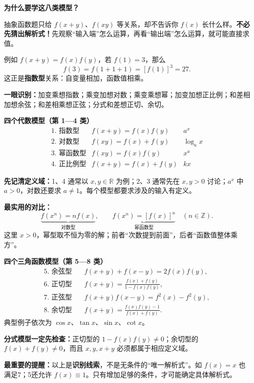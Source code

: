 \FReserve{4cm}
\begin{statementbox}
	\textbf{\textcolor{CStatement}{为什么要学这八类模型？}}

	抽象函数题只给 $f(x+y)$、$f(xy)$ 等关系，却不告诉你 $f(x)$ 长什么样。\textbf{不必先猜出解析式！}先观察“输入端”怎么运算，再看“输出端”怎么运算，就可能直接求值。

	例如 $f(x+y)=f(x)f(y)$，若 $f(1)=3$，那么
	\[
		f(3)=f(1+1+1)=[f(1)]^3=27.
	\]
	这正是\textbf{指数型}关系：自变量相加，函数值相乘。

	

	\textbf{一眼识别：}加变乘想指数；乘变加想对数；乘变乘想幂；加变加想正比例；和差相加想余弦；和差相乘想正弦；分式和差想正切、余切。
\end{statementbox}

\FReserve{4cm}
\begin{statementbox}
	\textbf{\textcolor{CStatement}{四个代数模型（第 1—4 类）}}
	\[
		\begin{array}{cll}
			\text{1. 指数型}  & f(x+y)=f(x)f(y)  & a^x      \\[4pt]
			\text{2. 对数型}  & f(xy)=f(x)+f(y)  & \log_a x \\[4pt]
			\text{3. 幂函数型} & f(xy)=f(x)f(y)   & x^a      \\[4pt]
			\text{4. 正比例型} & f(x+y)=f(x)+f(y) & kx
		\end{array}
	\]

	\textbf{先记清定义域：}1、4 通常以 $x,y\in\mathbb R$ 为例；2、3 通常先在 $x,y>0$ 讨论；$a^x$ 中 $a>0$，对数还要求 $a\ne1$。每个模型都要求涉及的输入有定义。

	\textbf{最实用的对比：}
	\[
		\underbrace{f(x^n)=n f(x)}_{\text{对数型}},\qquad
		\underbrace{f(x^n)=[f(x)]^n}_{\text{幂函数型}}\quad(n\in\mathbb Z).
	\]
	这里 $x>0$，幂型取不恒为零的解；前者“次数提到前面”，后者“函数值整体乘方”。
\end{statementbox}

\FReserve{4cm}
\begin{statementbox}
	\textbf{\textcolor{CStatement}{四个三角函数模型（第 5—8 类）}}
	\[
		\begin{aligned}
			\text{5. 余弦型}\quad & f(x+y)+f(x-y)=2f(x)f(y),             \\[4pt]
			\text{6. 正切型}\quad & f(x+y)=\frac{f(x)+f(y)}{1-f(x)f(y)}, \\[5pt]
			\text{7. 正弦型}\quad & f(x+y)f(x-y)=f^2(x)-f^2(y),          \\[4pt]
			\text{8. 余切型}\quad & f(x+y)=\frac{f(x)f(y)-1}{f(x)+f(y)}.
		\end{aligned}
	\]
	典型例子依次为 $\cos x$、$\tan x$、$\sin x$、$\cot x$。

	\textbf{分式模型一定先检查：}正切型的 $1-f(x)f(y)\ne0$；余切型的 $f(x)+f(y)\ne0$，而且 $x,y,x+y$ 必须都属于相应定义域。

	\textbf{最重要的提醒：}以上是\textbf{识别线索}，不是无条件的“唯一解析式”。如 $f(x)=x$ 也满足7；5还允许 $f(x)\equiv1$。只有增加足够的条件，才可能确定具体解析式。
\end{statementbox}

